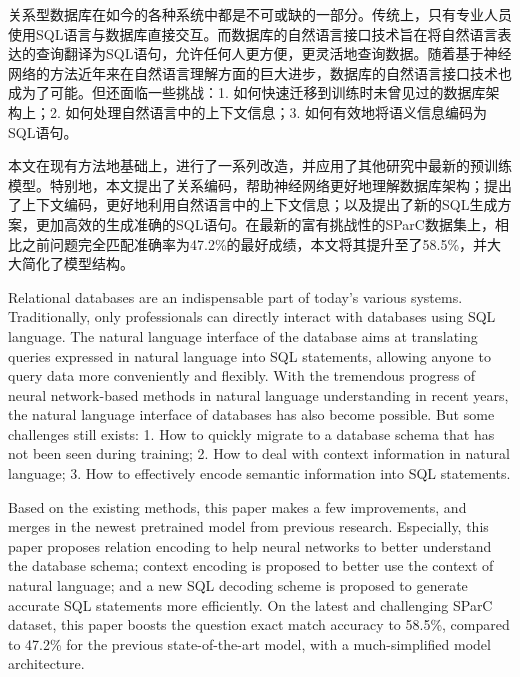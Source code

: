 \begin{abstractCN}
关系型数据库在如今的各种系统中都是不可或缺的一部分。传统上，只有专业人员使用SQL语言与数据库直接交互。而数据库的自然语言接口技术旨在将自然语言表达的查询翻译为SQL语句，允许任何人更方便，更灵活地查询数据。随着基于神经网络的方法近年来在自然语言理解方面的巨大进步，数据库的自然语言接口技术也成为了可能。但还面临一些挑战：1. 如何快速迁移到训练时未曾见过的数据库架构上；2. 如何处理自然语言中的上下文信息；3. 如何有效地将语义信息编码为SQL语句。

本文在现有方法地基础上，进行了一系列改造，并应用了其他研究中最新的预训练模型。特别地，本文提出了关系编码，帮助神经网络更好地理解数据库架构；提出了上下文编码，更好地利用自然语言中的上下文信息；以及提出了新的SQL生成方案，更加高效的生成准确的SQL语句。在最新的富有挑战性的SParC数据集上，相比之前问题完全匹配准确率为47.2\%的最好成绩，本文将其提升至了58.5\%，并大大简化了模型结构。
\end{abstractCN}

\begin{abstractEN}
Relational databases are an indispensable part of today's various systems. Traditionally, only professionals can directly interact with databases using SQL language. The natural language interface of the database aims at translating queries expressed in natural language into SQL statements, allowing anyone to query data more conveniently and flexibly. With the tremendous progress of neural network-based methods in natural language understanding in recent years, the natural language interface of databases has also become possible. But some challenges still exists: 1. How to quickly migrate to a database schema that has not been seen during training; 2. How to deal with context information in natural language; 3. How to effectively encode semantic information into SQL statements.

Based on the existing methods, this paper makes a few improvements, and merges in the newest pretrained model from previous research. Especially, this paper proposes relation encoding to help neural networks to better understand the database schema; context encoding is proposed to better use the context of natural language; and a new SQL decoding scheme is proposed to generate accurate SQL statements more efficiently. On the latest and challenging SParC dataset, this paper boosts the question exact match accuracy to 58.5\%, compared to 47.2\% for the previous state-of-the-art model, with a much-simplified model architecture.
\end{abstractEN}
